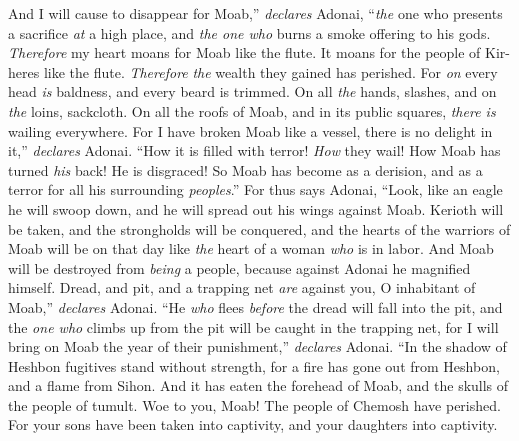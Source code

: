 \begin{biblechapter}
\verse And I will cause to disappear for Moab,” \textit{declares} Adonai, 
“\textit{the} one who presents a sacrifice \textit{at} a high place, 
and \textit{the one who} burns a smoke offering to his gods.
\verse \textit{Therefore} my heart moans for Moab like the flute. 
It moans for the people of Kir-heres like the flute. 
\textit{Therefore} \textit{the} wealth they gained has perished.
\verse For \textit{on} every head \textit{is} baldness, 
and every beard is trimmed. 
On all \textit{the} hands, slashes, 
and on \textit{the} loins, sackcloth.
\verse On all the roofs of Moab, and in its public squares, 
\textit{there is} wailing everywhere. 
For I have broken Moab like a vessel, 
there is no delight in it,” \textit{declares} Adonai.
\verse “How it is filled with terror! \textit{How} they wail! 
How Moab has turned \textit{his} back! He is disgraced! 
So Moab has become as a derision, 
and as a terror for all his surrounding \textit{peoples}.”
\verse For thus says Adonai,
\verse “Look, like an eagle he will swoop down, 
and he will spread out his wings against Moab.
\verse Kerioth will be taken, 
and the strongholds will be conquered, 
and the hearts of the warriors of Moab will be on that day 
like \textit{the} heart of a woman \textit{who} is in labor.
\verse And Moab will be destroyed from \textit{being} a people, 
because against Adonai he magnified himself.
\verse Dread, and pit, and a trapping net \textit{are} against you, 
O inhabitant of Moab,” \textit{declares} Adonai.
\verse “He \textit{who} flees \textit{before} the dread 
will fall into the pit, 
and the \textit{one who} climbs up from the pit 
will be caught in the trapping net, 
for I will bring on Moab 
the year of their punishment,” \textit{declares} Adonai.
\verse “In the shadow of Heshbon 
fugitives stand without strength, 
for a fire has gone out from Heshbon, 
and a flame from Sihon. 
And it has eaten the forehead of Moab, 
and the skulls of the people of tumult.
\verse Woe to you, Moab! 
The people of Chemosh have perished. 
For your sons have been taken into captivity, 
and your daughters into captivity.
\end{biblechapter}

